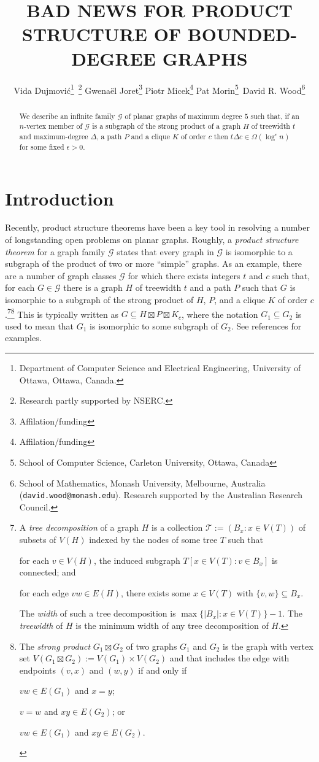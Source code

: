 \documentclass{patmorin}
\title{\MakeUppercase{Bad News for Product Structure of Bounded-Degree Graphs}}
\author{%
  Vida Dujmović\thanks{Department of Computer Science and Electrical Engineering, University of Ottawa, Ottawa, Canada.}\, \thanks{Research partly supported by NSERC.} \quad
  Gwenaël Joret\thanks{Affilation/funding} \quad
  Piotr Micek\thanks{Affilation/funding}\quad
  Pat Morin\thanks{School of Computer Science, Carleton University, Ottawa, Canada}\, \footnotemark[2] \quad
  David R. Wood\thanks{School of Mathematics, Monash University, Melbourne, Australia (\texttt{david.wood@monash.edu}). Research supported by the Australian Research Council.}
}
\date{}
\newcommand{\defin}[1]{\emph{\color{brightmaroon}#1}}
\begin{document}
\maketitle
\renewcommand{\E}{\mathbb{E}}
\renewcommand{\Pr}{\mathbb{P}}


\begin{abstract}
  We describe an infinite family $\mathcal{G}$ of planar graphs of maximum degree $5$ such that, if an $n$-vertex member of $\mathcal{G}$ is a subgraph of the strong product of a graph $H$ of treewidth $t$ and maximum-degree $\Delta$, a path $P$ and a clique $K$ of order $c$ then $t\Delta c \in \Omega(\log^\epsilon n)$ for some fixed $\epsilon >0$.
\end{abstract}

\section{Introduction}

Recently, product structure theorems have been a key tool in resolving a number of longstanding open problems on planar graphs.  Roughly, a \defin{product structure theorem} for a graph family $\mathcal{G}$ states that every graph in $\mathcal{G}$ is isomorphic to a subgraph of the product of two or more ``simple'' graphs.  As an example, there are a number of graph classes $\mathcal{G}$ for which there exists integers $t$ and $c$ such that, for each $G\in\mathcal{G}$ there is a graph $H$ of treewidth $t$ and a path $P$ such that $G$ is isomorphic to a subgraph of the strong product of $H$, $P$, and a clique $K$ of order $c$.\footnote{A \defin{tree decomposition} of a graph $H$ is a collection $\mathcal{T}:=(B_x:x\in V(T))$ of subsets of $V(H)$ indexed by the nodes of some tree $T$ such that
\begin{inparaenum}[(i)]
  \item for each $v\in V(H)$, the induced subgraph $T[x\in V(T):v\in B_x]$ is connected; and
  \item for each edge $vw\in E(H)$, there exists some $x\in V(T)$ with $\{v,w\}\subseteq B_x$.
\end{inparaenum}
The \defin{width} of such a tree decomposition is $\max\{|B_x|:x\in V(T)\}-1$. The \defin{treewidth} of $H$ is the minimum width of any tree decomposition of $H$.}\footnote{The \defin{strong product} $G_1\boxtimes G_2$ of two graphs $G_1$ and $G_2$ is the graph with vertex set $V(G_1\boxtimes G_2):=V(G_1)\times V(G_2)$ and that includes the edge with endpoints $(v,x)$ and $(w,y)$ if and only if
\begin{inparaenum}[(i)]
  \item $vw\in E(G_1)$ and $x=y$;
  \item $v=w$ and $xy\in E(G_2)$; or
  \item $vw\in E(G_1)$ and $xy\in E(G_2)$.
\end{inparaenum}
}
This is typically written as $G\subseteq H\boxtimes P\boxtimes K_c$, where the notation $G_1\subseteq G_2$ is used to mean that $G_1$ is isomorphic to some subgraph of $G_2$.  See references \cite{dujmovic.joret.ea:planar,dujmovic.morin.ea:structure,krauthgamer.lee:intrinsic,ueckerdt.wood.ea:improved,bose.morin.ea:optimal,campbell.clinch.ea:product,illingworth.scott.ea:alon} for examples.
\end{document}
